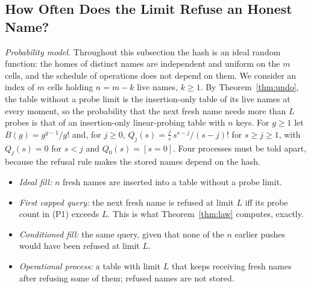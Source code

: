 \subsection{How Often Does the Limit Refuse an Honest Name?}
\label{sec:law}
\emph{Probability model.} Throughout this subsection the hash is an ideal random function: the homes of distinct names are independent and uniform on the $m$ cells, and the schedule of operations does not depend on them. We consider an index of $m$ cells holding $n=m-k$ live names, $k\ge1$. By Theorem~\ref{thm:undo}, the table without a probe limit is the insertion-only table of its live names at every moment, so the probability that the next fresh name needs more than $L$ probes is that of an insertion-only linear-probing table with $n$ keys. For $g\ge1$ let $B(g)=g^{g-1}/g!$ and, for $j\ge0$, $Q_j(s)=\tfrac{j}{s}\,s^{s-j}/(s-j)!$ for $s\ge j\ge1$, with $Q_j(s)=0$ for $s<j$ and $Q_0(s)=[s=0]$. Four processes must be told apart, because the refusal rule makes the stored names depend on the hash.
\begin{itemize}
\item[(P1)] \emph{Ideal fill:} $n$ fresh names are inserted into a table without a probe limit.
\item[(P2)] \emph{First capped query:} the next fresh name is refused at limit $L$ iff its probe count in (P1) exceeds $L$. This is what Theorem~\ref{thm:law} computes, exactly.
\item[(P3)] \emph{Conditioned fill:} the same query, given that none of the $n$ earlier pushes would have been refused at limit $L$.
\item[(P4)] \emph{Operational process:} a table with limit $L$ that keeps receiving fresh names after refusing some of them; refused names are not stored.
\end{itemize}
